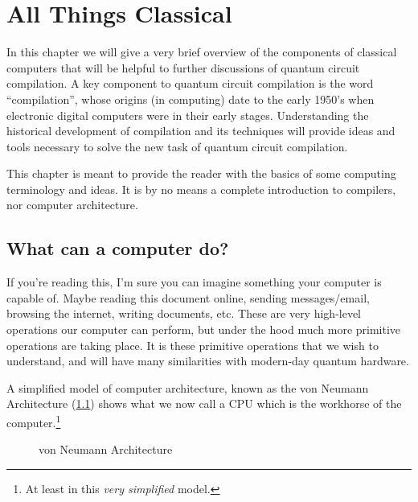 \chapter{All Things Classical}\label{chap:compilers}

In this chapter we will give a very brief overview of the components of classical computers that will be helpful to further discussions of quantum circuit compilation.
A key component to quantum circuit compilation is the word ``compilation'', whose origins (in computing) date to the early 1950's when electronic digital computers were in their early stages.
Understanding the historical development of compilation and its techniques will provide ideas and tools necessary to solve the new task of quantum circuit compilation.

This chapter is meant to provide the reader with the basics of some computing terminology and ideas.
It is by no means a complete introduction to compilers, nor computer architecture.

\section{What can a computer do?}

If you're reading this, I'm sure you can imagine something your computer is capable of.
Maybe reading this document online, sending messages/email, browsing the internet, writing documents, etc.
These are very high-level operations our computer can perform, but under the hood much more primitive operations are taking place.
It is these primitive operations that we wish to understand, and will have many similarities with modern-day quantum hardware.

A simplified model of computer architecture, known as the von Neumann Architecture (\cref{fig:comparch}) shows what we now call a \ac{CPU} which is the workhorse of the computer.\footnote{At least in this \emph{very simplified} model.}

\begin{figure}[h]
    \centering
    
    \caption{von Neumann Architecture}\label{fig:comparch}
\end{figure}

